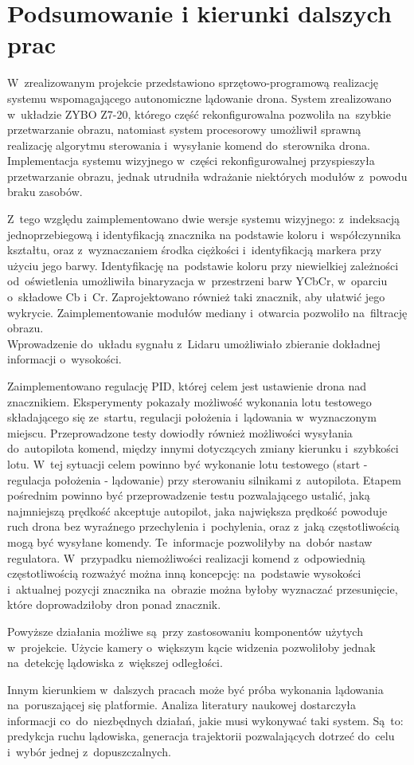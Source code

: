 \chapter{Podsumowanie i kierunki dalszych prac}
\label{cha:Podsumowanie i kierunki dalszych prac}
W~zrealizowanym projekcie przedstawiono sprzętowo-programową realizację systemu wspomagającego autonomiczne lądowanie drona. System zrealizowano w~układzie ZYBO Z7-20, którego część rekonfigurowalna pozwoliła na~szybkie przetwarzanie obrazu, natomiast system procesorowy umożliwił sprawną realizację algorytmu sterowania i~wysyłanie komend do~sterownika drona. Implementacja systemu wizyjnego w~części rekonfigurowalnej przyspieszyła przetwarzanie obrazu, jednak utrudniła wdrażanie niektórych modułów z~powodu braku zasobów.\par
Z~tego względu zaimplementowano dwie wersje systemu wizyjnego: z~indeksacją jednoprzebiegową i identyfikacją znacznika na podstawie koloru i~współczynnika kształtu, oraz z~wyznaczaniem środka ciężkości i~identyfikacją markera przy użyciu jego barwy. Identyfikację na~podstawie koloru przy niewielkiej zależności od~oświetlenia umożliwiła binaryzacja w~przestrzeni barw YCbCr, w~oparciu o~składowe Cb i~Cr. Zaprojektowano również taki znacznik, aby ułatwić jego wykrycie. Zaimplementowanie modułów mediany i~otwarcia pozwoliło na~filtrację obrazu.\\
Wprowadzenie do~układu sygnału z~Lidaru umożliwiało zbieranie dokładnej informacji o~wysokości.\par
Zaimplementowano regulację PID, której celem jest ustawienie drona nad znacznikiem. Eksperymenty pokazały możliwość wykonania lotu testowego składającego się ze~startu, regulacji położenia i~lądowania w~wyznaczonym miejscu.
Przeprowadzone testy dowiodły również możliwości wysyłania do~autopilota komend, między innymi dotyczących zmiany kierunku i~szybkości lotu. 
W~tej sytuacji celem powinno być wykonanie lotu testowego (start - regulacja położenia - lądowanie) przy sterowaniu silnikami z~autopilota. Etapem pośrednim powinno być przeprowadzenie testu pozwalającego ustalić, jaką najmniejszą prędkość akceptuje autopilot, jaka największa prędkość powoduje ruch drona bez wyraźnego przechylenia i~pochylenia, oraz z~jaką częstotliwością mogą być wysyłane komendy. Te~informacje pozwoliłyby na~dobór nastaw regulatora. W~przypadku niemożliwości realizacji komend z~odpowiednią częstotliwością rozważyć można inną koncepcję: na~podstawie wysokości i~aktualnej pozycji znacznika na~obrazie można byłoby wyznaczać przesunięcie, które doprowadziłoby dron ponad znacznik.\par
Powyższe działania możliwe są~przy zastosowaniu komponentów użytych w~projekcie. Użycie kamery o~większym kącie widzenia pozwoliłoby jednak na~detekcję lądowiska z~większej odległości.\par
Innym kierunkiem w~dalszych pracach może być próba wykonania lądowania na~poruszającej się platformie. Analiza literatury naukowej dostarczyła informacji co~do~niezbędnych działań, jakie musi wykonywać taki system. Są~to: predykcja ruchu lądowiska, generacja trajektorii pozwalających dotrzeć do~celu i~wybór jednej z~dopuszczalnych.

